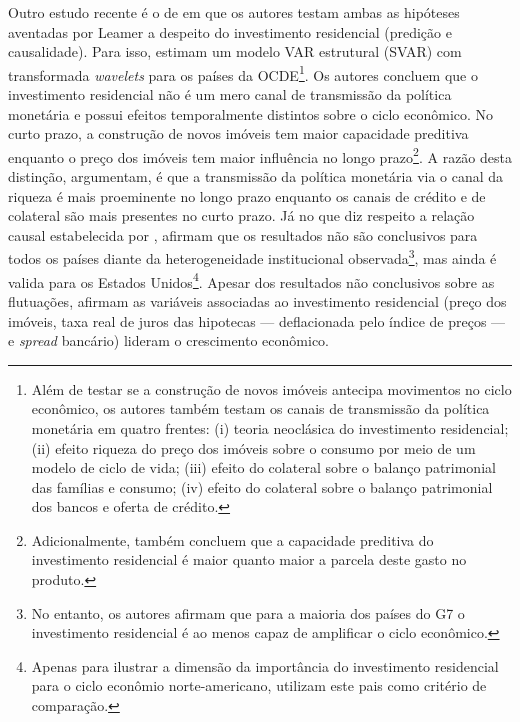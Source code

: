 Outro estudo recente é o de \textcite{huang_is_2018} em que os autores testam ambas as hipóteses aventadas por Leamer a despeito do investimento residencial (predição e causalidade). Para isso, estimam um modelo VAR estrutural (SVAR) com transformada \textit{wavelets} para os países da OCDE\footnote{
	Além de testar se a construção de novos imóveis antecipa movimentos no ciclo econômico, os autores também testam os canais de transmissão da política monetária em quatro frentes: (i) teoria neoclásica do investimento residencial; (ii) efeito riqueza do preço dos imóveis sobre o consumo por meio de um modelo de ciclo de vida; (iii) efeito do colateral sobre o balanço patrimonial das famílias e consumo; (iv) efeito do colateral sobre o balanço patrimonial dos bancos e oferta de crédito.}.  
Os autores concluem que o investimento residencial não é um mero canal de transmissão da política monetária e possui efeitos temporalmente distintos sobre o ciclo econômico. No curto prazo, a construção de novos imóveis tem maior capacidade preditiva enquanto o preço dos imóveis tem maior influência no longo prazo\footnote{Adicionalmente, \textcite{huang_is_2018} também concluem que a capacidade preditiva do investimento residencial é maior quanto maior a parcela deste gasto no produto.}. A razão desta distinção, argumentam, é que a transmissão da política monetária via o canal da riqueza é mais proeminente no longo prazo enquanto os canais de crédito e de colateral são mais presentes no curto prazo. Já no que diz respeito a relação causal estabelecida por \textcite{leamer_housing_2007}, afirmam que os resultados não são conclusivos para todos os países diante da heterogeneidade institucional observada\footnote{
	No entanto, os autores afirmam que para a maioria dos países do G7 o investimento residencial é ao menos capaz de amplificar o ciclo econômico.}, mas ainda é valida para os Estados Unidos\footnote{
	Apenas para ilustrar a dimensão da importância do investimento residencial para o ciclo econômio norte-americano, \textcite{huang_is_2018} utilizam este pais como critério de comparação.}.
Apesar dos resultados não conclusivos sobre as flutuações, afirmam as variáveis associadas ao investimento residencial (preço dos imóveis, taxa real de juros das hipotecas --- deflacionada pelo índice de preços --- e \textit{spread} bancário) lideram o crescimento econômico.



